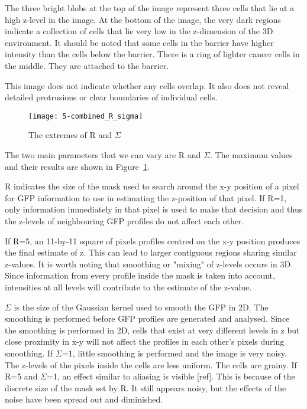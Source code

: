 The three bright blobs at the top of the image represent three cells that lie at a high z-level in the image. At the bottom of the image, the very dark regions indicate a collection of cells that lie very low in the z-dimension of the 3D environment. It should be noted that some cells in the barrier have higher intensity than the cells below the barrier. There is a ring of lighter cancer cells in the middle. They are attached to the barrier.

This image does not indicate whether any cells overlap. It also does not reveal detailed protrusions or clear boundaries of individual cells.

\begin{figure}[htbp!]
\centering
\texttt{[image: 5-combined\_R\_sigma]}
\caption{The extremes of R and $\Sigma$}
\label{fig:r_and_sigma}
\end{figure}

The two main parameters that we can vary are R and $\Sigma$. The maximum values and their results are shown in Figure~\ref{fig:r_and_sigma}.

R indicates the size of the mask used to search around the x-y position of a pixel for GFP information to use in estimating the z-position of that pixel. If R=1, only information immediately in that pixel is used to make that decision and thus the z-levels of neighbouring GFP profiles do not affect each other.

If R=5, an 11-by-11 square of pixels profiles centred on the x-y position produces the final estimate of z. This can lead to larger contiguous regions sharing similar z-values. It is worth noting that smoothing or "mixing" of z-levels occurs in 3D. Since information from every profile inside the mask is taken into account, intensities at all levels will contribute to the estimate of the z-value.

$\Sigma$ is the size of the Gaussian kernel used to smooth the GFP in 2D. The smoothing is performed before GFP profiles are generated and analysed. Since the smoothing is performed in 2D, cells that exist at very different levels in z but close proximity in x-y will not affect the profiles in each other's pixels during smoothing. If $\Sigma$=1, little smoothing is performed and the image is very noisy. The z-levels of the pixels inside the cells are less uniform. The cells are grainy. If R=5 and $\Sigma$=1, an effect similar to aliasing is visible [ref]. This is because of the discrete size of the mask set by R. It still appears noisy, but the effects of the noise have been spread out and diminished.

